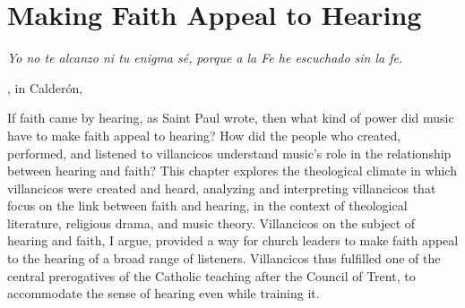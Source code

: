 
%
%
%


\chapter{Making Faith Appeal to Hearing}
\label{ch:faith-hearing}

\epigraph{%
        \emph{Yo no te alcanzo ni tu enigma sé,} \newline
        \emph{porque a la Fe he escuchado sin la fe.}
%
}{%
    , in Calderón, \\
        \Autocite[]{Calderon:Retiro}%
} 

If faith came by hearing, as Saint Paul wrote, then what kind of power did music
have to make faith appeal to hearing?
How did the people who created, performed, and listened to villancicos
understand music's role in the relationship between hearing and faith?
This chapter explores the theological climate in which villancicos were created
and heard, analyzing and interpreting villancicos that focus on the link between
faith and hearing, in the context of theological literature, religious drama,
and music theory.
Villancicos on the subject of hearing and faith, I argue, provided a way for
church leaders to make faith appeal to the hearing of a broad range of
listeners.
Villancicos thus fulfilled one of the central prerogatives of the Catholic
teaching after the Council of Trent, to accommodate the sense of
hearing even while training it.

